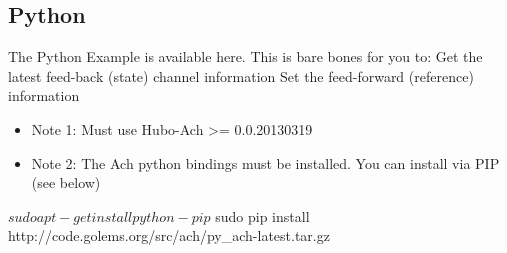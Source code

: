 \subsection{Python}
The Python Example is available here. This is bare bones for you to:
Get the latest feed-back (state) channel information
Set the feed-forward (reference) information
\begin{itemize}
\item Note 1: Must use Hubo-Ach >= 0.0.20130319 
\item Note 2: The Ach python bindings must be installed. You can install via PIP (see below)
\end{itemize}

\begin{code}
$ sudo apt-get install python-pip
$ sudo pip install http://code.golems.org/src/ach/py_ach-latest.tar.gz
\end{code}